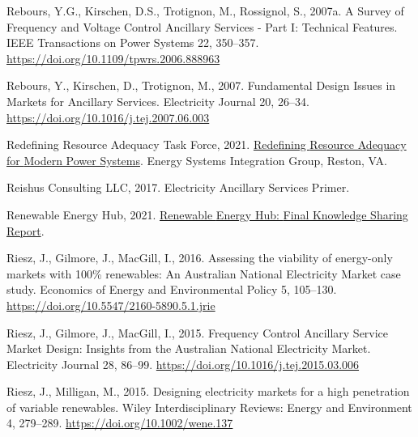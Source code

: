 \documentclass[12pt,a4paper,]{report}
\newlength{\cslhangindent}
\newenvironment{CSLReferences}[2] %
 {%
  \setlength{\parindent}{0pt}
  \ifodd #1 \everypar{\setlength{\hangindent}{\cslhangindent}}\ignorespaces\fi
  \ifnum #2 > 0
  \setlength{\parskip}{#2\baselineskip}
  \fi
 }%
 {}
\begin{document}
\begin{CSLReferences}{1}{0}
\leavevmode{}%
Rebours, Y.G., Kirschen, D.S., Trotignon, M., Rossignol, S., 2007a. A
{Survey} of {Frequency} and {Voltage Control Ancillary Services} - {Part
I}: {Technical Features}. IEEE Transactions on Power Systems 22,
350--357. \url{https://doi.org/10.1109/tpwrs.2006.888963}

\leavevmode{}%
Rebours, Y., Kirschen, D., Trotignon, M., 2007. Fundamental {Design
Issues} in {Markets} for {Ancillary Services}. Electricity Journal 20,
26--34. \url{https://doi.org/10.1016/j.tej.2007.06.003}

\leavevmode{}%
Redefining Resource Adequacy Task Force, 2021.
\href{https://www.esig.energy/wp-content/uploads/2021/08/ESIG-Redefining-Resource-Adequacy-2021.pdf}{Redefining
{Resource Adequacy} for {Modern Power Systems}}. {Energy Systems
Integration Group}, {Reston, VA}.

\leavevmode{}%
Reishus Consulting LLC, 2017. Electricity {Ancillary Services Primer}.

\leavevmode{}%
Renewable Energy Hub, 2021.
\href{https://arena.gov.au/assets/2021/04/renewable-energy-hub-final-report.pdf}{Renewable
{Energy Hub}: {Final Knowledge Sharing Report}}.

\leavevmode{}%
Riesz, J., Gilmore, J., MacGill, I., 2016. Assessing the viability of
energy-only markets with 100\% renewables: {An Australian National
Electricity Market} case study. Economics of Energy and Environmental
Policy 5, 105--130. \url{https://doi.org/10.5547/2160-5890.5.1.jrie}

\leavevmode{}%
Riesz, J., Gilmore, J., MacGill, I., 2015. Frequency {Control Ancillary
Service Market Design}: {Insights} from the {Australian National
Electricity Market}. Electricity Journal 28, 86--99.
\url{https://doi.org/10.1016/j.tej.2015.03.006}

\leavevmode{}%
Riesz, J., Milligan, M., 2015. Designing electricity markets for a high
penetration of variable renewables. Wiley Interdisciplinary Reviews:
Energy and Environment 4, 279--289.
\url{https://doi.org/10.1002/wene.137}


\end{CSLReferences}
\end{document}
